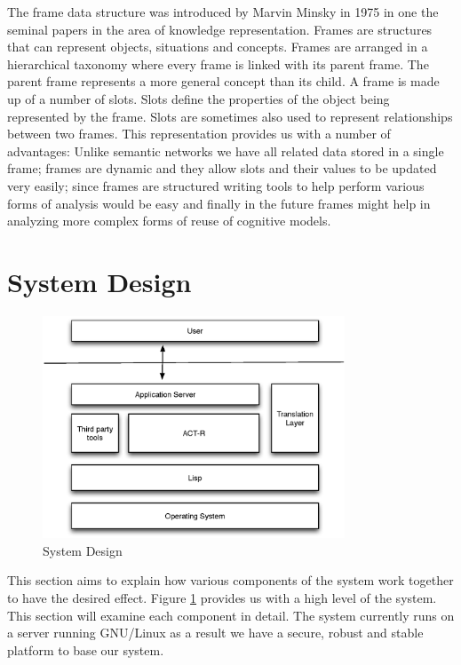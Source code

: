 
The frame data structure was introduced by Marvin
Minsky\cite{Minsky1974a} in 1975 in one the seminal papers in the area
of knowledge representation. Frames are structures that can represent
objects, situations and concepts. Frames are arranged in a
hierarchical taxonomy where every frame is linked with its parent
frame. The parent frame represents a more general concept than its
child\cite{karp-93}. A frame is made up of a number of slots. Slots
define the properties of the object being represented by the
frame. Slots are sometimes also used to represent relationships
between two frames. This representation provides us with a number of
advantages: Unlike semantic networks we have all related data stored
in a single frame; frames are dynamic and they allow slots and their
values to be updated very easily; since frames are structured writing
tools to help perform various forms of analysis would be easy and
finally in the future frames might help in analyzing more complex
forms of reuse of cognitive models.



\section{System Design}

\begin{figure}[htp]
  \centering
  \includegraphics[width=90mm]{SystemOverview}
  \caption{System Design}
  \label{SysOverview}
\end{figure}

This section aims to explain how various components of the system work
together to have the desired effect. Figure \ref{SysOverview} provides
us with a high level of the system.  This section will examine each
component in detail. The system currently runs on a server running
GNU/Linux as a result we have a secure, robust and stable platform to
base our system.

